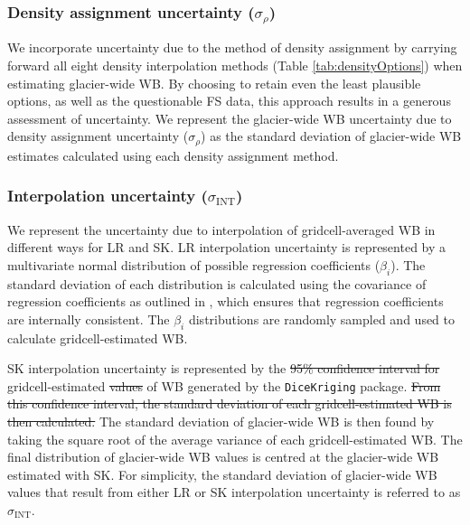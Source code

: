 \documentclass[review,oneside, letterpaper]{igs} %
\providecommand{\DIFadd}[1]{{\protect\color{blue}\uwave{#1}}} %
\providecommand{\DIFdel}[1]{{\protect\color{red}\sout{#1}}}                      %
\providecommand{\DIFaddbegin}{} %
\providecommand{\DIFaddend}{} %
\providecommand{\DIFdelbegin}{} %
\providecommand{\DIFdelend}{} %
\newcommand{\DIFscaledelfig}{0.5}
\newlength{\DIFdelgraphicswidth} %
\newlength{\DIFdelgraphicsheight} %
\newcommand{\DIFaddincludegraphics}[2][]{{\color{blue}\fbox{\DIFOincludegraphics[#1]{#2}}}} %
\newcommand{\DIFdelincludegraphics}[2][]{%
\sbox{\DIFdelgraphicsbox}{\DIFOincludegraphics[#1]{#2}}%
\settoboxwidth{\DIFdelgraphicswidth}{\DIFdelgraphicsbox} %
\settoboxtotalheight{\DIFdelgraphicsheight}{\DIFdelgraphicsbox} %
\scalebox{\DIFscaledelfig}{%
\parbox[b]{\DIFdelgraphicswidth}{\usebox{\DIFdelgraphicsbox}\\[-\baselineskip] \rule{\DIFdelgraphicswidth}{0em}}\llap{\resizebox{\DIFdelgraphicswidth}{\DIFdelgraphicsheight}{%
\setlength{\unitlength}{\DIFdelgraphicswidth}%
\begin{picture}(1,1)%
\thicklines\linethickness{2pt} %
{\color[rgb]{1,0,0}\put(0,0){\framebox(1,1){}}}%
{\color[rgb]{1,0,0}\put(0,0){\line( 1,1){1}}}%
{\color[rgb]{1,0,0}\put(0,1){\line(1,-1){1}}}%
\end{picture}%
}\hspace*{3pt}}} %
} %
\DeclareRobustCommand{\DIFaddbegin}{\DIFOaddbegin \let\includegraphics\DIFaddincludegraphics} %
\DeclareRobustCommand{\DIFaddend}{\DIFOaddend \let\includegraphics\DIFOincludegraphics} %
\DeclareRobustCommand{\DIFdelbegin}{\DIFOdelbegin \let\includegraphics\DIFdelincludegraphics} %
\DeclareRobustCommand{\DIFdelend}{\DIFOaddend \let\includegraphics\DIFOincludegraphics} %
\begin{document}
	\subsubsection{Density assignment uncertainty ($\sigma_{\rho}$)}
We incorporate uncertainty due to the method of density assignment by carrying forward all eight density interpolation methods (Table \ref{tab:densityOptions}) when estimating glacier-wide WB. By choosing to retain even the least plausible options, as well as the questionable FS data, this approach results in a generous assessment of uncertainty. We represent the glacier-wide WB uncertainty due to density assignment uncertainty ($\sigma_{\rho}$) as the standard deviation of glacier-wide WB estimates calculated using each density assignment method.

	\subsubsection{Interpolation uncertainty ($\sigma_{\mathrm{INT}}$)}
We represent the uncertainty due to interpolation of gridcell-averaged WB in different ways for LR and SK. LR interpolation uncertainty is represented by a multivariate normal distribution of possible regression coefficients ($\beta_i$). The standard deviation of each distribution is calculated using the covariance of regression coefficients as outlined in \cite{Bagos2015}, which ensures that regression coefficients are internally consistent. The $\beta_i$ distributions are randomly sampled and used to calculate gridcell-estimated WB.

SK interpolation uncertainty is represented by the \DIFdelbegin \DIFdel{95\% confidence interval for }\DIFdelend \DIFaddbegin \DIFadd{standard deviation for each }\DIFaddend gridcell-estimated \DIFdelbegin \DIFdel{values }\DIFdelend \DIFaddbegin \DIFadd{value }\DIFaddend of WB generated by the \texttt{DiceKriging} package. \DIFdelbegin \DIFdel{From this confidence interval, the standard deviation of each gridcell-estimated WB is then calculated. }\DIFdelend The standard deviation of glacier-wide WB is then found by taking the square root of the average variance of each gridcell-estimated WB. The final distribution of glacier-wide WB values is centred at the glacier-wide WB estimated with SK. For simplicity, the standard deviation of glacier-wide WB values that result from either LR or SK interpolation uncertainty is referred to as $\sigma_{\mathrm{INT}}$.



\end{document}
